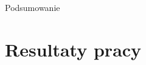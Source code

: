  \begin{chapter}{Podsumowanie}
	\newcommand{\chapterPath}{chapters/Summary}

	\section{Resultaty pracy}
\end{chapter}
